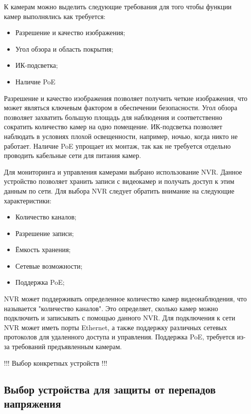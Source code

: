 К камерам можно выделить следующие требования для того чтобы функции камер выполнялись как требуется:

\begin{itemize}
    \item Разрешение и качество изображения;
    \item Угол обзора и область покрытия;
    \item ИК-подсветка;
    \item Наличие PoE
\end{itemize}

Разрешение и качество изображения позволяет получить четкие изображения, что может являться ключевым фактором в обеспечении безопасности. 
Угол обзора позволяет захватить большую площадь для наблюдения и соответственно сократить количество камер на одно помещение.
ИК-подсветка позволяет наблюдать в условиях плохой освещенности, например, ночью, когда никто не работает. Наличие PoE упрощает их
монтаж, так как не требуется отдельно проводить кабельные сети для питания камер.

Для мониторинга и управления камерами выбрано использование NVR. Данное устройство позволяет хранить записи с видеокамер и получать
доступ к этим данным по сети.
Для выбора NVR следует обратить внимание на следующие характеристики:

\begin{itemize}
    \item Количество каналов;
    \item Разрешение записи;
    \item Ёмкость хранения;
    \item Сетевые возможности;
    \item Поддержка PoE;
\end{itemize}

NVR может поддерживать определенное количество камер видеонаблюдения, 
что называется "количество каналов". Это определяет, сколько камер можно подключить и 
записывать с помощью данного NVR. Для подключения к сети NVR может иметь порты Ethernet, а также 
поддержку различных сетевых протоколов для удаленного доступа и управления. Поддержка PoE, требуется 
из-за требований предъявленным камерам. 

!!! Выбор конкретных устройств !!!

\subsection{Выбор устройства для защиты от перепадов напряжения}

